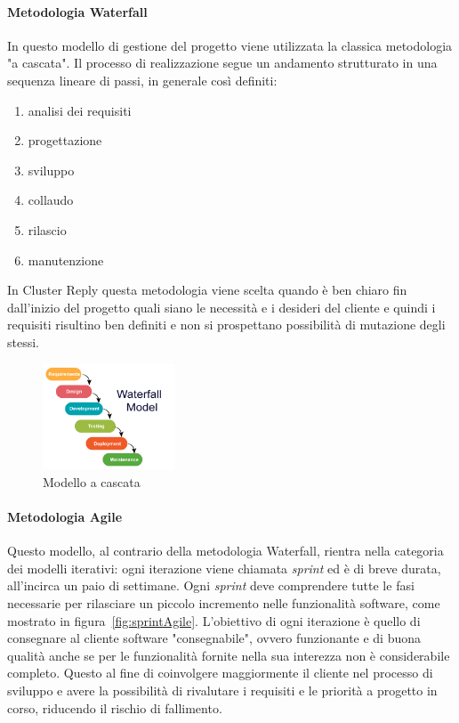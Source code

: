 \paragraph{Metodologia Waterfall} In questo modello di gestione del progetto viene utilizzata la classica metodologia "a cascata". Il processo di realizzazione segue un andamento strutturato in una sequenza lineare di passi, in generale così definiti:
\begin{enumerate}
  \item analisi dei requisiti
  \item progettazione
  \item sviluppo
  \item collaudo
  \item rilascio
  \item manutenzione
\end{enumerate}
In Cluster Reply questa metodologia viene scelta quando è ben chiaro fin dall'inizio del progetto quali siano le necessità e i desideri del cliente e quindi i requisiti risultino ben definiti e non si prospettano possibilità di mutazione degli stessi.
\begin{figure}[ht]
  \centering
  \includegraphics[width=0.35\textwidth]{waterfall-model.png}
  \caption{Modello a cascata}
  \label{fig:waterfallModel}
\end{figure}

\paragraph{Metodologia Agile} Questo modello, al contrario della metodologia Waterfall, rientra nella categoria dei modelli iterativi: ogni iterazione viene chiamata \textit{sprint} ed è di breve durata, all'incirca un paio di settimane. Ogni \textit{sprint} deve comprendere tutte le fasi necessarie per rilasciare un piccolo incremento nelle funzionalità software, come mostrato in figura~\vref{fig:sprintAgile}. L'obiettivo di ogni iterazione è quello di consegnare al cliente software "consegnabile", ovvero funzionante e di buona qualità anche se per le funzionalità fornite nella sua interezza non è considerabile completo. Questo al fine di coinvolgere maggiormente il cliente nel processo di sviluppo e avere la possibilità di rivalutare i requisiti e le priorità a progetto in corso, riducendo il rischio di fallimento. 

